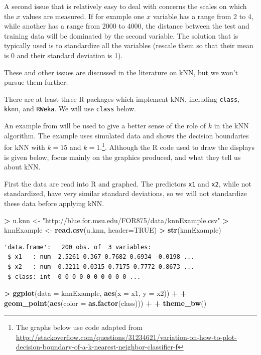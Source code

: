 \documentclass[]{krantz}
\makeatletter
\newenvironment{Shaded}{\begin{snugshade}}{\end{snugshade}}
\newcommand{\DataTypeTok}[1]{\textcolor[rgb]{0.27,0.27,0.27}{#1}}
\newcommand{\KeywordTok}[1]{\textcolor[rgb]{0.27,0.27,0.27}{\textbf{#1}}}
\newcommand{\NormalTok}[1]{#1}
\newcommand{\OperatorTok}[1]{\textcolor[rgb]{0.43,0.43,0.43}{\textbf{#1}}}
\newcommand{\OtherTok}[1]{\textcolor[rgb]{0.37,0.37,0.37}{#1}}
\newcommand{\StringTok}[1]{\textcolor[rgb]{0.5,0.5,0.5}{#1}}
\newenvironment{kframe}{%
\medskip{}
\setlength{\fboxsep}{.8em}
 \def\at@end@of@kframe{}%
 \ifinner\ifhmode%
  \def\at@end@of@kframe{\end{minipage}}%
  \begin{minipage}{\columnwidth}%
 \fi\fi%
 \def\FrameCommand##1{\hskip\@totalleftmargin \hskip-\fboxsep
 \colorbox{shadecolor}{##1}\hskip-\fboxsep
     \hskip-\linewidth \hskip-\@totalleftmargin \hskip\columnwidth}%
 \MakeFramed {\advance\hsize-\width
   \@totalleftmargin\z@ \linewidth\hsize
   \@setminipage}}%
 {\par\unskip\endMakeFramed%
 \at@end@of@kframe}
\renewenvironment{Shaded}{\begin{kframe}}{\end{kframe}}
\makeatother
\begin{document}
A second issue that is relatively easy to deal with concerns the scales on which the \(x\) values are measured. If for example one \(x\) variable has a range from 2 to 4, while another has a range from 2000 to 4000, the distance between the test and training data will be dominated by the second variable. The solution that is typically used is to standardize all the variables (rescale them so that their mean is 0 and their standard deviation is 1).

These and other issues are discussed in the literature on kNN, but we won't pursue them further.

There are at least three R packages which implement kNN, including \texttt{class}, \texttt{kknn}, and \texttt{RWeka}. We will use \texttt{class} below.

An example from \citet{hastieESL} will be used to give a better sense of the role of \(k\) in the kNN algorithm. The example uses simulated data and shows the decision boundaries for kNN with \(k=15\) and \(k=1\).\footnote{The graphs below use code adapted from \url{http://stackoverflow.com/questions/31234621/variation-on-how-to-plot-decision-boundary-of-a-k-nearest-neighbor-classifier-f}}. Although the R code used to draw the displays is given below, focus mainly on the graphics produced, and what they tell us about kNN.

First the data are read into R and graphed. The predictors \texttt{x1} and \texttt{x2}, while not standardized, have very similar standard deviations, so we will not standardize these data before applying kNN.

\begin{Shaded}
\begin{Highlighting}[]
\OperatorTok{>}\StringTok{ }\NormalTok{u.knn <-}\StringTok{ "http://blue.for.msu.edu/FOR875/data/knnExample.csv"}
\OperatorTok{>}\StringTok{ }\NormalTok{knnExample <-}\StringTok{ }\KeywordTok{read.csv}\NormalTok{(u.knn, }\DataTypeTok{header=}\OtherTok{TRUE}\NormalTok{)}
\OperatorTok{>}\StringTok{ }\KeywordTok{str}\NormalTok{(knnExample)}
\end{Highlighting}
\end{Shaded}

\begin{verbatim}
'data.frame':   200 obs. of  3 variables:
 $ x1   : num  2.5261 0.367 0.7682 0.6934 -0.0198 ...
 $ x2   : num  0.3211 0.0315 0.7175 0.7772 0.8673 ...
 $ class: int  0 0 0 0 0 0 0 0 0 0 ...
\end{verbatim}

\begin{Shaded}
\begin{Highlighting}[]
\OperatorTok{>}\StringTok{ }\KeywordTok{ggplot}\NormalTok{(}\DataTypeTok{data =}\NormalTok{ knnExample, }\KeywordTok{aes}\NormalTok{(}\DataTypeTok{x =}\NormalTok{ x1, }\DataTypeTok{y =}\NormalTok{ x2)) }\OperatorTok{+}\StringTok{ }
\OperatorTok{+}\StringTok{    }\KeywordTok{geom_point}\NormalTok{(}\KeywordTok{aes}\NormalTok{(}\DataTypeTok{color =} \KeywordTok{as.factor}\NormalTok{(class))) }\OperatorTok{+}
\OperatorTok{+}\StringTok{    }\KeywordTok{theme_bw}\NormalTok{()}
\end{Highlighting}
\end{Shaded}
\end{document}
